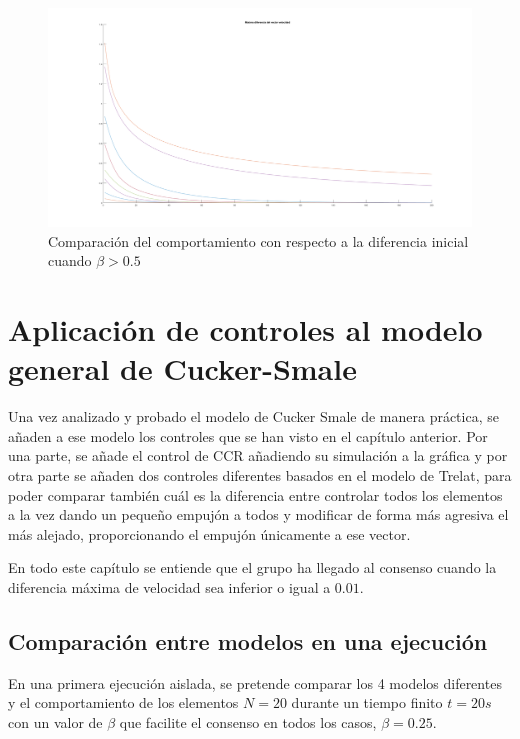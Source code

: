 \begin{figure}[!h]
    \centering
    \includegraphics[width=\textwidth]{fig/cap04/2CSB075/consenso/todas.png}
    \caption{Comparación del comportamiento con respecto a la diferencia inicial cuando $\beta > 0.5$}
    \label{fig:CS075_comparacion_consenso}
\end{figure}

\newpage
\clearpage

\section{Aplicación de controles al modelo general de Cucker-Smale} \label{s4_4}

Una vez analizado y probado el modelo de Cucker Smale de manera práctica, se añaden a ese modelo los controles que se han visto en el capítulo anterior. Por una parte, se añade el control de CCR añadiendo su simulación a la gráfica y por otra parte se añaden dos controles diferentes basados en el modelo de Trelat, para poder comparar también cuál es la diferencia entre controlar todos los elementos a la vez dando un pequeño empujón a todos y modificar de forma más agresiva el más alejado, proporcionando el empujón únicamente a ese vector. 

En todo este capítulo se entiende que el grupo ha llegado al consenso cuando la diferencia máxima de velocidad sea inferior o igual a $0.01$.

\subsection{Comparación entre modelos en una ejecución}
En una primera ejecución aislada, se pretende comparar los 4 modelos diferentes y el comportamiento de los elementos $N=20$ durante un tiempo finito $t=20s$ con un valor de $\beta$ que facilite el consenso en todos los casos, $\beta=0.25$.

